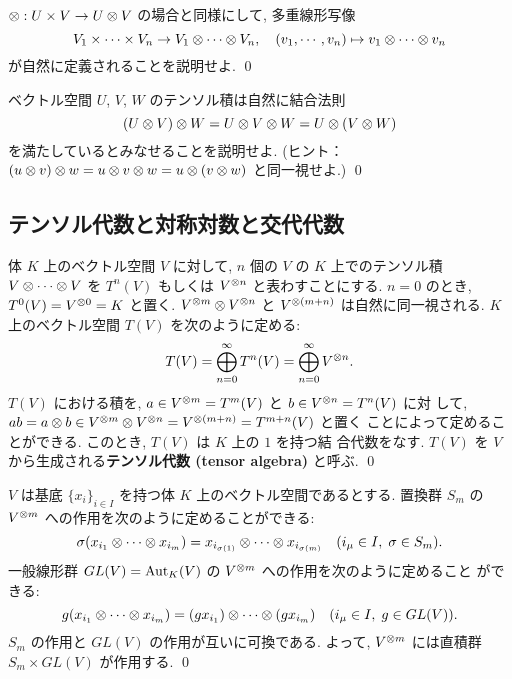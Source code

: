 \documentclass[12pt,twoside]{jarticle}
\begin{document}
\begin{question}
  $\otimes:U\times V\to U\otimes V$ の場合と同様にして, 多重線形写像
  \begin{equation*}
    V_1\times\cdots\times V_n \to V_1\otimes\cdots\otimes V_n, \quad
    (v_1,\cdots,v_n) \mapsto v_1\otimes\cdots\otimes v_n
  \end{equation*}
  が自然に定義されることを説明せよ. \qed
\end{question}

\begin{question}
  ベクトル空間 $U$, $V$, $W$ のテンソル積は自然に結合法則
  \begin{equation*}
    (U\otimes V)\otimes W = U\otimes V\otimes W = U\otimes(V\otimes W)
  \end{equation*}
  を満たしているとみなせることを説明せよ.  
  (ヒント： $(u\otimes v)\otimes w = u\otimes v\otimes w = u\otimes(v\otimes w)$ と同一視せよ.)
  \qed
\end{question}


\subsection{テンソル代数と対称対数と交代代数}

\begin{definition}[テンソル代数]
  体 $K$ 上のベクトル空間 $V$ に対して, 
  $n$ 個の $V$ の $K$ 上でのテンソル積 $V\otimes\cdots\otimes V$ を $T^n(V)$
  もしくは $V^{\otimes n}$ と表わすことにする.
  $n=0$ のとき, $T^0(V) = V^{\otimes0} = K$ と置く.
  $V^{\otimes m}\otimes V^{\otimes n}$ と $V^{\otimes (m+n)}$ は自然に同一視される.
  $K$ 上のベクトル空間 $T(V)$ を次のように定める:
  \begin{equation*}
    T(V) = \bigoplus_{n=0}^\infty T^n(V) = \bigoplus_{n=0}^\infty V^{\otimes n}.
  \end{equation*}
  $T(V)$ における積を, $a\in V^{\otimes m}=T^m(V)$ と $b\in V^{\otimes n}=T^n(V)$ に対
  して,  $ab = a\otimes b\in V^{\otimes m}\otimes V^{\otimes n}=V^{\otimes (m+n)}=T^{m+n}(V)$ と置く
  ことによって定めることができる. このとき, $T(V)$ は $K$ 上の $1$ を持つ結
  合代数をなす.  
  $T(V)$ を $V$ から生成される{\bf テンソル代数 (tensor algebra)} と呼ぶ.
  \qed
\end{definition}

\begin{question}\label{q:pre-Weyl-reciprocity}
  $V$ は基底 $\{x_i\}_{i\in I}$ を持つ体 $K$ 上のベクトル空間であるとする.
  置換群 $S_m$ の $V^{\otimes m}$ への作用を次のように定めることができる:
  \begin{equation*}
    \sigma(x_{i_1}\otimes\cdots\otimes x_{i_m}) 
    = x_{i_{\sigma(1)}}\otimes\cdots\otimes x_{i_{\sigma(m)}}
    \quad (i_\mu\in I,\; \sigma\in S_m).
  \end{equation*}
  一般線形群 $GL(V)=\mathop{\mathrm{Aut}}\nolimits_K(V)$ の $V^{\otimes m}$ への作用を次のように定めること
  ができる:
  \begin{equation*}
    g (x_{i_1}\otimes\cdots\otimes x_{i_m})
    = (g x_{i_1})\otimes\cdots\otimes(g x_{i_m})
    \quad (i_\mu\in I,\; g\in GL(V)).
  \end{equation*}
  $S_m$ の作用と $GL(V)$ の作用が互いに可換である. 
  よって, $V^{\otimes m}$ には直積群 $S_m\times GL(V)$ が作用する. \qed
\end{question}
\end{document}
